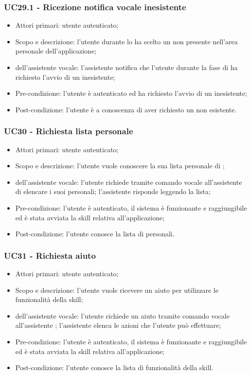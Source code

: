 \subsubsection{UC29.1 - Ricezione notifica vocale  inesistente}
\begin{itemize}
	\item Attori primari: utente autenticato;
	\item Scopo e descrizione: l'utente durante lo  ha scelto un  non presente nell'area personale dell'applicazione;
	\item {} dell'assistente vocale: l'assistente notifica che l'utente durante la fase di  ha richiesto l'avvio di un  inesistente;
	\item Pre-condizione: l'utente è autenticato ed ha richiesto l'avvio di un  inesistente;
	\item Post-condizione: l'utente è a conoscenza di aver richiesto un  non esistente.
\end{itemize}
\subsubsection{UC30 - Richiesta lista personale }
\begin{itemize}
	\item Attori primari: utente autenticato;
	\item Scopo e descrizione: l'utente vuole conoscere la sua lista personale di ;
	\item {} dell'assistente vocale: l'utente richiede tramite comando vocale all'assistente   di elencare i suoi  personali; l'assistente risponde leggendo la lista;
	\item Pre-condizione: l'utente è autenticato, il sistema è funzionante e raggiungibile ed è stata avviata la skill relativa all'applicazione;
	\item Post-condizione: l'utente conosce la lista di  personali.
\end{itemize}
\subsubsection{UC31 - Richiesta aiuto}
\begin{itemize}
	\item Attori primari: utente autenticato;
	\item Scopo e descrizione: l'utente vuole ricevere un aiuto per utilizzare le funzionalità della skill;
	\item {} dell'assistente vocale: l'utente richiede un aiuto tramite comando vocale all'assistente  ; l'assistente elenca le azioni che l'utente può effettuare;
	\item Pre-condizione: l'utente è autenticato, il sistema è funzionante e raggiungibile ed è stata avviata la skill relativa all'applicazione;
	\item Post-condizione: l'utente conosce la lista di funzionalità della skill.
\end{itemize}
